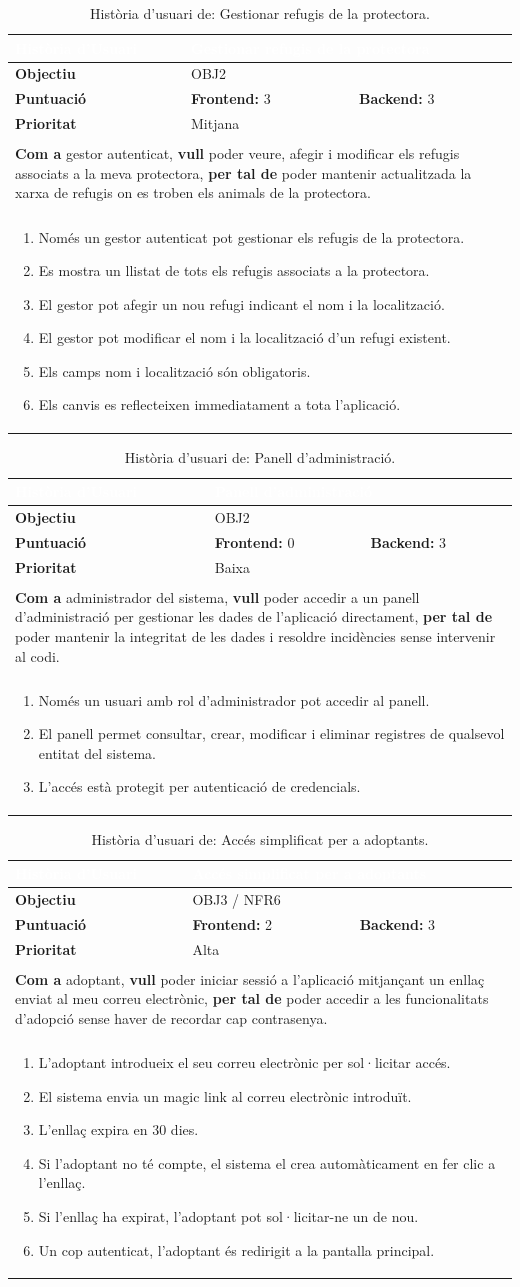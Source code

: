 \documentclass[11pt,a4paper]{report}
\newcommand{\HU}[9]{%
\begin{table}[H]\centering\footnotesize\renewcommand{\arraystretch}{1.1}%
\setlength{\extrarowheight}{0pt}%
\begin{tabular}{|l|p{4.8cm}|p{4.8cm}|}\hline
\rowcolor{oceanblue}\textcolor{white}{\textbf{Història d'Usuari}} & \multicolumn{2}{l|}{\textcolor{white}{#2}} \\\hline
\textbf{Objectiu} & \multicolumn{2}{l|}{#1} \\\hline
\rowcolor{gray!10}\textbf{Puntuació} & \textbf{Frontend: } #3 & \textbf{Backend: } #4 \\\hline
\textbf{Prioritat} & \multicolumn{2}{l|}{#5} \\\hline
\rowcolor{oceanblue}\multicolumn{3}{|l|}{\textcolor{white}{\textbf{Descripció}}} \\\hline
\multicolumn{3}{|p{12.5cm}|}{\textbf{Com a} #6, \textbf{vull} #7, \textbf{per tal de} #8.} \\\hline
\rowcolor{oceanblue}\multicolumn{3}{|l|}{\textcolor{white}{\textbf{Criteris d'Acceptació}}} \\\hline
\multicolumn{3}{|p{12.5cm}|}{\begin{enumerate}[leftmargin=0.4cm,topsep=0pt,parsep=0pt,itemsep=1pt,partopsep=0pt,after=\vspace{-3pt}] #9 \end{enumerate}} \\\hline
\end{tabular}\caption[HU: #2]{Història d'usuari de: #2.}\label{tab:hu_#1}\end{table}%
}
\begin{document}
    \HU{OBJ2}
    {Gestionar refugis de la protectora}
    {3}
    {3}
    {Mitjana}
    {gestor autenticat}
    {poder veure, afegir i modificar els refugis associats a la meva protectora}
    {poder mantenir actualitzada la xarxa de refugis on es troben els animals de la protectora}
    {
        \item Només un gestor autenticat pot gestionar els refugis de la protectora.
        \item Es mostra un llistat de tots els refugis associats a la protectora.
        \item El gestor pot afegir un nou refugi indicant el nom i la localització.
        \item El gestor pot modificar el nom i la localització d'un refugi existent.
        \item Els camps nom i localització són obligatoris.
        \item Els canvis es reflecteixen immediatament a tota l'aplicació.
    }
    \HU{OBJ2}
    {Panell d'administració}
    {0}
    {3}
    {Baixa}
    {administrador del sistema}
    {poder accedir a un panell d'administració per gestionar les dades de l'aplicació directament}
    {poder mantenir la integritat de les dades i resoldre incidències sense intervenir al codi}
    {
        \item Només un usuari amb rol d'administrador pot accedir al panell.
        \item El panell permet consultar, crear, modificar i eliminar registres de qualsevol entitat del sistema.
        \item L'accés està protegit per autenticació de credencials.
    }
    \HU{OBJ3 / NFR6}
    {Accés simplificat per a adoptants}
    {2}
    {3}
    {Alta}
    {adoptant}
    {poder iniciar sessió a l'aplicació mitjançant un enllaç enviat al meu correu electrònic}
    {poder accedir a les funcionalitats d'adopció sense haver de recordar cap contrasenya}
    {
        \item L'adoptant introdueix el seu correu electrònic per sol·licitar accés.
        \item El sistema envia un magic link al correu electrònic introduït.
        \item L'enllaç expira en 30 dies.
        \item Si l'adoptant no té compte, el sistema el crea automàticament en fer clic a l'enllaç.
        \item Si l'enllaç ha expirat, l'adoptant pot sol·licitar-ne un de nou.
        \item Un cop autenticat, l'adoptant és redirigit a la pantalla principal.
    }
\end{document}
